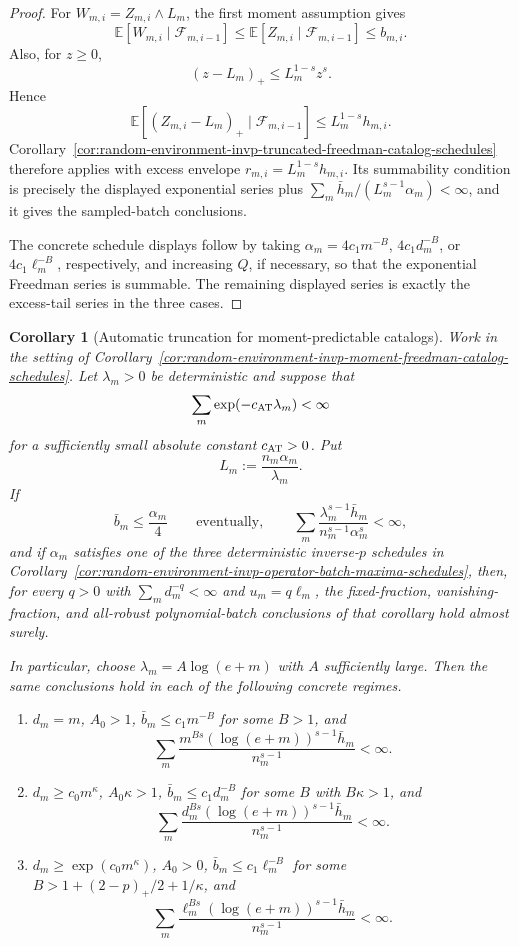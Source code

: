 \documentclass[11pt]{amsart}
\numberwithin{equation}{section}
\newtheorem{corollary}[theorem]{Corollary}
\theoremstyle{definition}
\theoremstyle{remark}
\newcommand{\Exp}{\mathbb E}
\begin{document}
\begin{proof}
For \(W_{m,i}=Z_{m,i}\wedge L_m\), the first moment assumption gives
\[
  \Exp[W_{m,i}\mid\mathcal F_{m,i-1}]
  \le
  \Exp[Z_{m,i}\mid\mathcal F_{m,i-1}]
  \le b_{m,i}.
\]
Also, for \(z\ge0\),
\[
  (z-L_m)_+\le L_m^{1-s}z^s .
\]
Hence
\[
  \Exp[(Z_{m,i}-L_m)_+\mid\mathcal F_{m,i-1}]
  \le L_m^{1-s}h_{m,i}.
\]
Corollary~\ref{cor:random-environment-invp-truncated-freedman-catalog-schedules}
therefore applies with excess envelope
\(r_{m,i}=L_m^{1-s}h_{m,i}\).  Its summability condition is precisely the
displayed exponential series plus
\(\sum_m\bar h_m/(L_m^{s-1}\alpha_m)<\infty\), and it gives the sampled-batch
conclusions.

The concrete schedule displays follow by taking
\(\alpha_m=4c_1m^{-B}\), \(4c_1d_m^{-B}\), or \(4c_1\ell_m^{-B}\), respectively,
and increasing \(Q\), if necessary, so that the exponential Freedman series is
summable.  The remaining displayed series is exactly the excess-tail series in
the three cases.
\end{proof}

\begin{corollary}[Automatic truncation for moment-predictable catalogs]
\label{cor:random-environment-invp-auto-truncation-freedman-catalog-schedules}
Work in the setting of
Corollary~\ref{cor:random-environment-invp-moment-freedman-catalog-schedules}.
Let \(\lambda_m>0\) be deterministic and suppose that
\[
  \sum_m \exp(-c_{\rm AT}\lambda_m)<\infty
\]
for a sufficiently small absolute constant \(c_{\rm AT}>0\).  Put
\[
  L_m:=\frac{n_m\alpha_m}{\lambda_m}.
\]
If
\[
  \bar b_m\le\frac{\alpha_m}{4}
  \qquad\text{eventually},
  \qquad
  \sum_m
  \frac{\lambda_m^{s-1}\bar h_m}{n_m^{s-1}\alpha_m^s}<\infty ,
\]
and if \(\alpha_m\) satisfies one of the three deterministic inverse-\(p\)
schedules in
Corollary~\ref{cor:random-environment-invp-operator-batch-maxima-schedules},
then, for every \(q>0\) with \(\sum_m d_m^{-q}<\infty\) and \(u_m=q\ell_m\),
the fixed-fraction, vanishing-fraction, and all-robust polynomial-batch
conclusions of that corollary hold almost surely.

In particular, choose \(\lambda_m=A\log(e+m)\) with \(A\) sufficiently large.
Then the same conclusions hold in each of the following concrete regimes.
\begin{enumerate}[label=\textup{(\roman*)},leftmargin=2.2em]
\item \(d_m=m\), \(A_0>1\), \(\bar b_m\le c_1m^{-B}\) for some \(B>1\), and
\[
  \sum_m
  \frac{m^{Bs}(\log(e+m))^{s-1}\bar h_m}{n_m^{s-1}}<\infty .
\]
\item \(d_m\ge c_0m^\kappa\), \(A_0\kappa>1\),
\(\bar b_m\le c_1d_m^{-B}\) for some \(B\) with \(B\kappa>1\), and
\[
  \sum_m
  \frac{d_m^{Bs}(\log(e+m))^{s-1}\bar h_m}{n_m^{s-1}}<\infty .
\]
\item \(d_m\ge\exp(c_0m^\kappa)\), \(A_0>0\),
\(\bar b_m\le c_1\ell_m^{-B}\) for some
\(B>1+(2-p)_+/2+1/\kappa\), and
\[
  \sum_m
  \frac{\ell_m^{Bs}(\log(e+m))^{s-1}\bar h_m}{n_m^{s-1}}<\infty .
\]
\end{enumerate}
\end{corollary}
\end{document}
